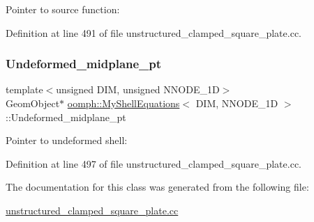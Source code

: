 Pointer to source function\+: 



Definition at line 491 of file unstructured\+\_\+clamped\+\_\+square\+\_\+plate.\+cc.

\mbox{\label{classoomph_1_1MyShellEquations_acf0107874213e70145eae84dfb3d4b5a}} 
\subsubsection{\texorpdfstring{Undeformed\+\_\+midplane\+\_\+pt}{Undeformed\_midplane\_pt}}
{\footnotesize\ttfamily template$<$unsigned D\+IM, unsigned N\+N\+O\+D\+E\+\_\+1D$>$ \\
Geom\+Object$\ast$ \hyperlink{classoomph_1_1MyShellEquations}{oomph\+::\+My\+Shell\+Equations}$<$ D\+IM, N\+N\+O\+D\+E\+\_\+1D $>$\+::Undeformed\+\_\+midplane\+\_\+pt\hspace{0.3cm}{\ttfamily [protected]}}



Pointer to undeformed shell\+: 



Definition at line 497 of file unstructured\+\_\+clamped\+\_\+square\+\_\+plate.\+cc.



The documentation for this class was generated from the following file\+:\begin{DoxyCompactItemize}
\item 
\hyperlink{unstructured__clamped__square__plate_8cc}{unstructured\+\_\+clamped\+\_\+square\+\_\+plate.\+cc}\end{DoxyCompactItemize}
